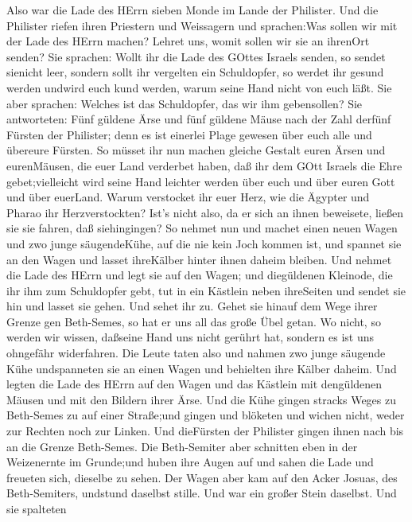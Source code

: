  Also war die Lade des HErrn sieben Monde im Lande der
Philister.  Und die Philister riefen ihren Priestern und
Weissagern und sprachen:Was sollen wir mit der Lade des HErrn machen?
Lehret uns, womit sollen wir sie an ihrenOrt senden?  Sie
sprachen: Wollt ihr die Lade des GOttes Israels senden, so sendet
sienicht leer, sondern sollt ihr vergelten ein Schuldopfer, so werdet
ihr gesund werden undwird euch kund werden, warum seine Hand nicht von
euch läßt.  Sie aber sprachen: Welches ist das Schuldopfer,
das wir ihm gebensollen? Sie antworteten: Fünf güldene Ärse und fünf
güldene Mäuse nach der Zahl derfünf Fürsten der Philister; denn es ist
einerlei Plage gewesen über euch alle und übereure Fürsten. 
So müsset ihr nun machen gleiche Gestalt euren Ärsen und eurenMäusen,
die euer Land verderbet haben, daß ihr dem GOtt Israels die Ehre
gebet;vielleicht wird seine Hand leichter werden über euch und über
euren Gott und über euerLand.  Warum verstocket ihr euer
Herz, wie die Ägypter und Pharao ihr Herzverstockten? Ist's nicht also,
da er sich an ihnen beweisete, ließen sie sie fahren, daß siehingingen?
 So nehmet nun und machet einen neuen Wagen und zwo junge
säugendeKühe, auf die nie kein Joch kommen ist, und spannet sie an den
Wagen und lasset ihreKälber hinter ihnen daheim bleiben. 
Und nehmet die Lade des HErrn und legt sie auf den Wagen; und
diegüldenen Kleinode, die ihr ihm zum Schuldopfer gebt, tut in ein
Kästlein neben ihreSeiten und sendet sie hin und lasset sie gehen.
 Und sehet ihr zu. Gehet sie hinauf dem Wege ihrer Grenze
gen Beth-Semes, so hat er uns all das große Übel getan. Wo nicht, so
werden wir wissen, daßseine Hand uns nicht gerührt hat, sondern es ist
uns ohngefähr widerfahren.  Die Leute taten also und nahmen
zwo junge säugende Kühe undspanneten sie an einen Wagen und behielten
ihre Kälber daheim.  Und legten die Lade des HErrn auf den
Wagen und das Kästlein mit dengüldenen Mäusen und mit den Bildern ihrer
Ärse.  Und die Kühe gingen stracks Weges zu Beth-Semes zu
auf einer Straße;und gingen und blöketen und wichen nicht, weder zur
Rechten noch zur Linken. Und dieFürsten der Philister gingen ihnen nach
bis an die Grenze Beth-Semes.  Die Beth-Semiter aber
schnitten eben in der Weizenernte im Grunde;und huben ihre Augen auf und
sahen die Lade und freueten sich, dieselbe zu sehen.  Der
Wagen aber kam auf den Acker Josuas, des Beth-Semiters, undstund
daselbst stille. Und war ein großer Stein daselbst. Und sie spalteten
